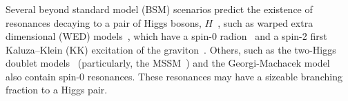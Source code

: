 




\subsubsection{}

Several beyond standard model (BSM) scenarios predict the existence of resonances decaying to a pair of Higgs bosons, $ H $~\cite{HiggsDiscoveryAtlas,HiggsDiscoveryCMS,CMSHiggsLongPaper}, such as warped extra dimensional (WED) models~\cite{Randall:1999ee}, which have a spin-0 
radion~\cite{Goldberger:1999uk,Csaki:1999mp,Csaki:2000zn} and a spin-2 first Kaluza--Klein (KK) excitation of the graviton~\cite{Davoudiasl:1999jd,DeWolfe:1999cp, Agashe:2007zd}. 
Others, such as the two-Higgs doublet models~\cite{Branco:2011iw} 
(particularly, the MSSM~\cite{Djouadi:2005gj}) and the Georgi-Machacek model~\cite{GEORGI1985463} also contain spin-0 
resonances. 
These resonances may have a sizeable branching fraction to a Higgs pair.

